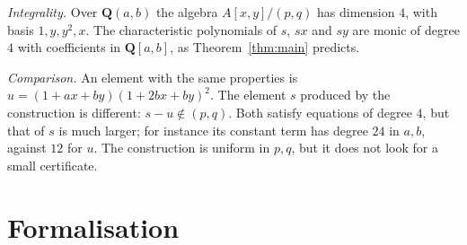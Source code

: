 \documentclass[11pt]{amsart}
\theoremstyle{definition}
\theoremstyle{remark}
\begin{document}
\emph{Integrality.} Over $\mathbf Q(a,b)$ the algebra $A[x,y]/(p,q)$ has
dimension $4$, with basis $1,y,y^2,x$. The characteristic polynomials of
$s$, $sx$ and $sy$ are monic of degree $4$ with coefficients in
$\mathbf Q[a,b]$, as Theorem~\ref{thm:main} predicts.

\emph{Comparison.} An element with the same properties is
$u=(1+ax+by)(1+2bx+by)^2$. The element $s$ produced by the construction is
different: $s-u\notin(p,q)$. Both satisfy equations of degree $4$, but that
of $s$ is much larger; for instance its constant term has degree $24$ in
$a,b$, against $12$ for $u$. The construction is uniform in $p,q$, but it
does not look for a small certificate.

\section{Formalisation}
\end{document}

